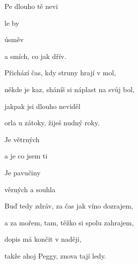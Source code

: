 


\zs
{} Pe  dlouho  tě nevi   

 le  by      

  úsměv  

a  smích, co  jak dřív.
\ks

\zs
Přichází čas, kdy struny hrají v mol,

někde je kaz, sháníš si náplast na svůj bol,

jakpak jsi dlouho neviděl

orla u zátoky, žiješ nudný roky.
\ks

\zr
Je   větrných 

a  je  co jsem ti  

Je   pavučiny  

věrných   a souhla
\kr

\zs
Buď tedy zdráv, za čas jak víno dozrajem,

a za mořem, tam, těžko si spolu zahrajem,

dopis má končit v naději,

takže ahoj Peggy, znova tají ledy.
\ks

\kp





